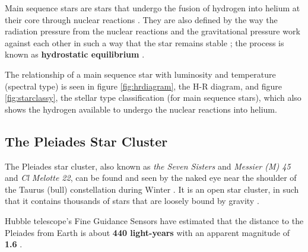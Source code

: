 \documentclass[12pt]{article}
\begin{document}
Main sequence stars are stars that undergo the fusion of hydrogen into helium at their core through nuclear reactions
\cite{schoolmsstar,studymsstar,nasamsstar}.
They are also defined by the way the radiation pressure from the nuclear reactions and the gravitational pressure work against each other in such a way that the star
remains stable \cite{studymsstar}; the process is known as \textbf{hydrostatic equilibrium} \cite{schoolmsstar}.

The relationship of a main sequence star with luminosity and temperature (spectral type) is seen in figure \ref{fig:hrdiagram}, the H-R diagram, and figure \ref{fig:starclassy},
the stellar type classification (for main sequence stars), which also shows the hydrogen available to undergo the nuclear reactions into helium.

\subsection{The Pleiades Star Cluster}

The Pleiades star cluster, also known as \textit{the Seven Sisters} and \textit{Messier (M) 45} and \textit{Cl Melotte 22}, can be found and seen by the naked eye near the shoulder of the Taurus (bull) constellation during Winter
\cite{nasapleiades,hubblepleiades}.
It is an open star cluster, in such that it contains thousands of stars that are loosely bound by gravity \cite{nasapleiades}.

Hubble telescope's Fine Guidance Sensors have estimated that the distance to the Pleiades from Earth is about \textbf{440 light-years} \cite{hubblepleiades} 
with an apparent magnitude of \textbf{1.6} \cite{sedspleiades,frenchpleiades}.
\end{document}
